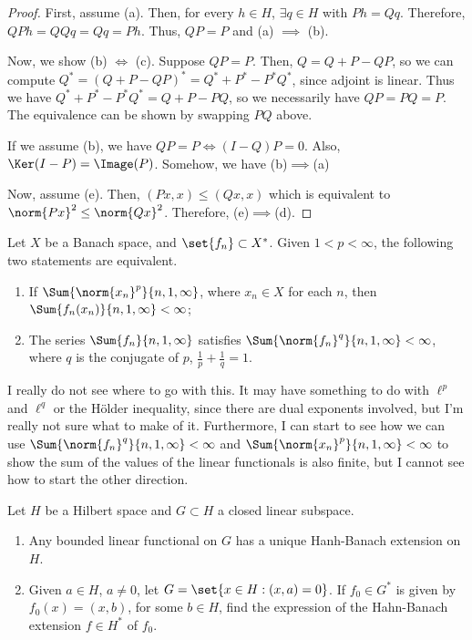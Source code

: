\documentclass[12pt,letterpaper,twoside]{hmcpset}
\begin{document}
\begin{solution}
  \begin{proof}
    First, assume (a).
    Then, for every $h \in H$, $\exists q \in H$ with $Ph = Qq$.
    Therefore, $QPh = QQq = Qq = Ph$.
    Thus, $QP = P$ and (a) $\implies$ (b).

    Now, we show (b) $\Leftrightarrow$ (c).
    Suppose $QP = P$.
    Then, $Q = Q + P - QP$, so we can compute $Q^* = (Q + P - QP)^* = Q^* + P^* - P^*Q^*$, since adjoint is linear.
    Thus we have $Q^* + P^* - P^*Q^* = Q + P - PQ$, so we necessarily have $QP = PQ = P$.
    The equivalence can be shown by swapping $PQ$ above.
    
    If we assume (b), we have $QP = P \Leftrightarrow (I - Q)P = 0$.
    Also, $\Ker(I-P) = \Image(P)$.
    Somehow, we have (b)$\implies$(a)

    Now, assume (e).
    Then, $(Px,x) \leq (Qx,x)$ which is equivalent to $\norm{Px}^2 \leq \norm{Qx}^2$.
    Therefore, (e)$\implies$(d).
  \end{proof}
\end{solution}
\begin{problem}[3][15]
  Let $X$ be a Banach space, and $\set{f_n} \subset X^*$.  Given $1 < p < \infty$, the following two statements are equivalent.
  \begin{enumerate}[label=(\alph*)]
  \item If $\Sum{\norm{x_n}^p}{n,1,\infty}$, where $x_n \in X$ for each $n$, then $\Sum{f_n(x_n)}{n,1,\infty} < \infty$;
  \item The series $\Sum{f_n}{n,1,\infty}$ satisfies $\Sum{\norm{f_n}^q}{n,1,\infty} < \infty$, where $q$ is the conjugate of $p$, \ie{} $\frac{1}{p} + \frac{1}{q} = 1$. 
  \end{enumerate}

\end{problem}

\begin{solution}
  I really do not see where to go with this.
  It may have something to do with $\ell^p$ and $\ell^q$ or the H\"{o}lder inequality, since there are dual exponents involved, but I'm really not sure what to make of it.
  Furthermore, I can start to see how we can use  $\Sum{\norm{f_n}^q}{n,1,\infty} < \infty$ and  $\Sum{\norm{x_n}^p}{n,1,\infty} < \infty$ to show the sum of the values of the linear functionals is also finite, but I cannot see how to start the other direction. 
\end{solution}
\begin{problem}[4][15]
  Let $H$ be a Hilbert space and $G \subset H$ a closed linear subspace.
  \begin{enumerate}[label=(\alph*)]
  \item Any bounded linear functional on $G$ has a unique Hanh-Banach extension on $H$.
  \item Given $a \in H$, $a \not= 0$, let $G = \set{x \in H : (x,a) = 0}$.
    If $f_0 \in G^*$ is given by $f_0(x) = (x,b)$, for some $b \in H$, find the expression of the Hahn-Banach extension $f \in H^*$ of $f_0$.
  \end{enumerate}
\end{problem}
\end{document}

